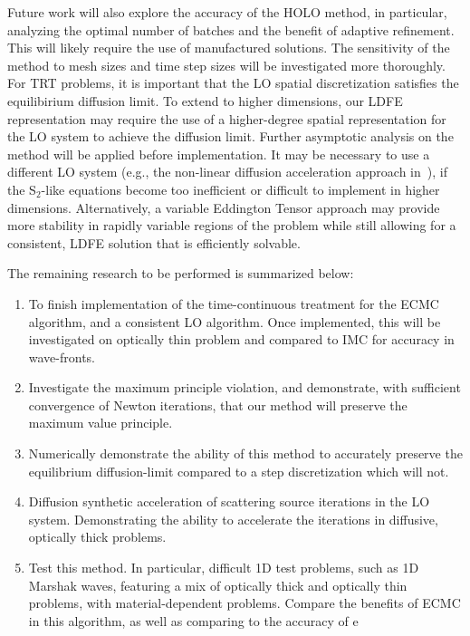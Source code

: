 \documentclass[11pt]{article}
\begin{document}
Future work will also explore the accuracy of the HOLO method, in particular,
analyzing the optimal number of batches and the benefit of adaptive refinement.  This will likely
require the use of manufactured solutions.  The sensitivity of the method to mesh sizes and time step sizes will be
investigated more thoroughly.  
For TRT problems, it is important that
the LO spatial discretization satisfies the equilibirium diffusion limit.  To extend
to higher dimensions, our LDFE representation may require the use of a higher-degree
spatial representation for the LO system to achieve the diffusion
limit. Further asymptotic
analysis on the method will be applied before implementation. It may be necessary to use a different LO system (e.g., the non-linear diffusion
acceleration approach in~\cite{rmc}), if the S$_2$-like equations become too
inefficient or difficult to implement in higher dimensions.  Alternatively, a
variable Eddington Tensor approach may provide more stability in rapidly variable
regions of the problem while still allowing for a consistent, LDFE solution that is efficiently solvable.

The remaining research to be performed is summarized below:
\begin{enumerate}
    \item To finish implementation of the time-continuous treatment for the ECMC
        algorithm, and a consistent LO algorithm.  Once implemented, this will be
        investigated on optically thin problem and compared to IMC for accuracy in 
        wave-fronts.
    \item Investigate the maximum principle violation, and demonstrate, with
        sufficient convergence of Newton iterations, that our method will preserve
        the maximum value principle.
    \item Numerically demonstrate the ability of this method to accurately preserve	the equilibrium diffusion-limit
	      compared to a step discretization which will not.
    \item Diffusion synthetic acceleration of scattering source iterations in the LO
        system. Demonstrating the ability to accelerate the iterations in diffusive, optically thick problems.
    \item Test this method.  In particular, difficult 1D test problems, such as 1D
        Marshak waves, featuring a mix of optically thick and optically thin problems, with material-dependent problems. Compare the benefits
		of ECMC in this algorithm, as well as comparing to the accuracy of e
\end{enumerate}

\pagebreak

\nocite{*}

\begin{spacing}{1}
  
  
\end{spacing}
\end{document}
